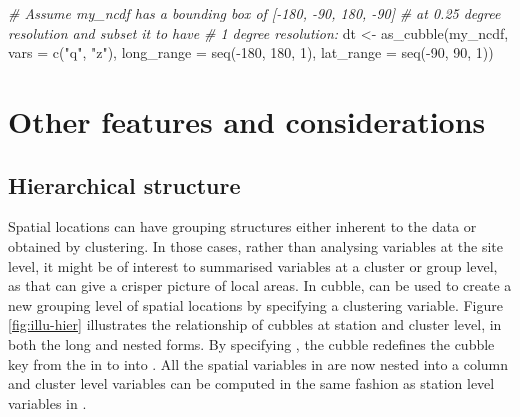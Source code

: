 \documentclass{article}
\newenvironment{Shaded}{\begin{snugshade}}{\end{snugshade}}
\newcommand{\AttributeTok}[1]{\textcolor[rgb]{0.77,0.63,0.00}{#1}}
\newcommand{\CommentTok}[1]{\textcolor[rgb]{0.56,0.35,0.01}{\textit{#1}}}
\newcommand{\DecValTok}[1]{\textcolor[rgb]{0.00,0.00,0.81}{#1}}
\newcommand{\FunctionTok}[1]{\textcolor[rgb]{0.00,0.00,0.00}{#1}}
\newcommand{\NormalTok}[1]{#1}
\newcommand{\OtherTok}[1]{\textcolor[rgb]{0.56,0.35,0.01}{#1}}
\newcommand{\SpecialCharTok}[1]{\textcolor[rgb]{0.00,0.00,0.00}{#1}}
\newcommand{\StringTok}[1]{\textcolor[rgb]{0.31,0.60,0.02}{#1}}
\begin{document}
\begin{Shaded}
\begin{Highlighting}[]
\CommentTok{\# Assume my\_ncdf has a bounding box of [{-}180, {-}90, 180, {-}90]}
\CommentTok{\# at 0.25 degree resolution and subset it to have}
\CommentTok{\# 1 degree resolution:}
\NormalTok{dt }\OtherTok{\textless{}{-}} \FunctionTok{as\_cubble}\NormalTok{(my\_ncdf, }\AttributeTok{vars =} \FunctionTok{c}\NormalTok{(}\StringTok{"q"}\NormalTok{, }\StringTok{"z"}\NormalTok{),}
                \AttributeTok{long\_range =} \FunctionTok{seq}\NormalTok{(}\SpecialCharTok{{-}}\DecValTok{180}\NormalTok{, }\DecValTok{180}\NormalTok{, }\DecValTok{1}\NormalTok{),}
                \AttributeTok{lat\_range =} \FunctionTok{seq}\NormalTok{(}\SpecialCharTok{{-}}\DecValTok{90}\NormalTok{, }\DecValTok{90}\NormalTok{, }\DecValTok{1}\NormalTok{))}
\end{Highlighting}
\end{Shaded}

\hypertarget{others}{%
\section{Other features and considerations}\label{others}}

\hypertarget{hierarchical-structure}{%
\subsection{Hierarchical structure}\label{hierarchical-structure}}

Spatial locations can have grouping structures either inherent to the data or obtained by clustering. In those cases, rather than analysing variables at the site level, it might be of interest to summarised variables at a cluster or group level, as that can give a crisper picture of local areas. In cubble,  can be used to create a new grouping level of spatial locations by specifying a clustering variable. Figure \ref{fig:illu-hier} illustrates the relationship of cubbles at station and cluster level, in both the long and nested forms. By specifying , the cubble redefines the cubble key from the  in  to  into . All the spatial variables in  are now nested into a  column and cluster level variables can be computed in the same fashion as station level variables in .
\end{document}
